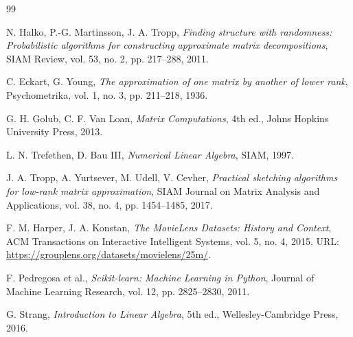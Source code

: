 \begin{thebibliography}{99}

N. Halko, P.-G. Martinsson, J. A. Tropp,
\emph{Finding structure with randomness: Probabilistic algorithms for
constructing approximate matrix decompositions}, SIAM Review, vol. 53,
no. 2, pp. 217--288, 2011.

C. Eckart, G. Young,
\emph{The approximation of one matrix by another of lower rank},
Psychometrika, vol. 1, no. 3, pp. 211--218, 1936.

G. H. Golub, C. F. Van Loan,
\emph{Matrix Computations}, 4th ed., Johns Hopkins University Press, 2013.

L. N. Trefethen, D. Bau III,
\emph{Numerical Linear Algebra}, SIAM, 1997.

J. A. Tropp, A. Yurtsever, M. Udell, V. Cevher,
\emph{Practical sketching algorithms for low-rank matrix approximation},
SIAM Journal on Matrix Analysis and Applications, vol. 38, no. 4,
pp. 1454--1485, 2017.

F. M. Harper, J. A. Konstan,
\emph{The MovieLens Datasets: History and Context},
ACM Transactions on Interactive Intelligent Systems, vol. 5, no. 4, 2015.
URL: \url{https://grouplens.org/datasets/movielens/25m/}.

F. Pedregosa et al.,
\emph{Scikit-learn: Machine Learning in Python},
Journal of Machine Learning Research, vol. 12, pp. 2825--2830, 2011.

G. Strang,
\emph{Introduction to Linear Algebra}, 5th ed.,
Wellesley-Cambridge Press, 2016.

\end{thebibliography}
